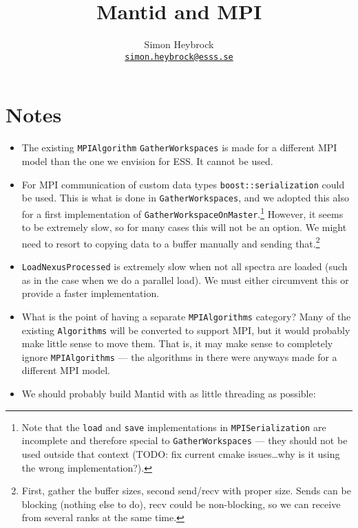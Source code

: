\documentclass[a4paper,english,numbers=noenddot,bibliography=totoc,chapterprefix=on,DIV=12]{scrartcl}
\begin{document}
\title{Mantid and MPI}
\author{Simon Heybrock\\
    {\small\href{mailto:simon.heybrock@esss.se}{\nolinkurl{simon.heybrock@esss.se}}}}

\maketitle

\tableofcontents

\section{Notes}

\begin{itemize}
  \item The existing \texttt{MPIAlgorithm} \texttt{GatherWorkspaces} is made for a different MPI model than the one we envision for ESS.
    It cannot be used.
  \item For MPI communication of custom data types \texttt{boost::serialization} could be used.
    This is what is done in \texttt{GatherWorkspaces}, and we adopted this also for a first implementation of \texttt{GatherWorkspaceOnMaster}.\footnote{Note that the \texttt{load} and \texttt{save} implementations in \texttt{MPISerialization} are incomplete and therefore special to \texttt{GatherWorkspaces} --- they should not be used outside that context (TODO: fix current cmake issues\dots why is it using the wrong implementation?).}
    However, it seems to be extremely slow, so for many cases this will not be an option.
    We might need to resort to copying data to a buffer manually and sending that.\footnote{First, gather the buffer sizes, second send/recv with proper size. Sends can be blocking (nothing else to do), recv could be non-blocking, so we can receive from several ranks at the same time.}
  \item \texttt{LoadNexusProcessed} is extremely slow when not all spectra are loaded (such as in the case when we do a parallel load).
    We must either circumvent this or provide a faster implementation.
  \item What is the point of having a separate \texttt{MPIAlgorithms} category?
    Many of the existing \texttt{Algorithms} will be converted to support MPI, but it would probably make little sense to move them.
    That is, it may make sense to completely ignore \texttt{MPIAlgorithms} --- the algorithms in there were anyways made for a different MPI model.
  \item We should probably build Mantid with as little threading as possible:

\end{itemize}
\end{document}
